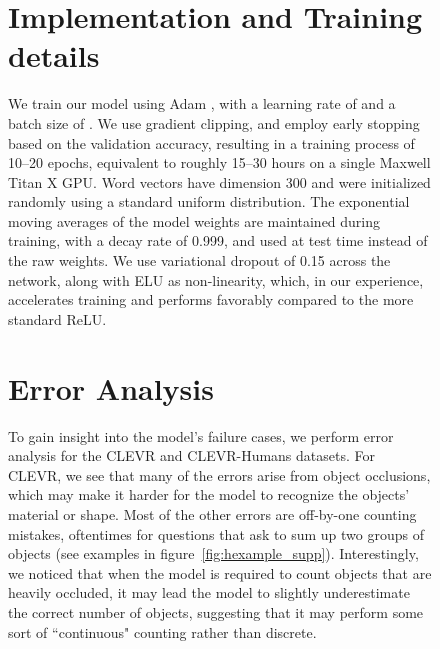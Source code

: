 \documentclass[fleqn]{article}
\newcommand{\figref}[1]{figure~\ref{fig:#1}}
\begin{document}
\begin{figure}[t]
\begin{minipage}{0.55\textwidth}
\section{Implementation and Training details}
\label{sec:expDetails} 
We train our model using Adam \citep{adam}, with a learning rate of  and a batch size of . We use gradient clipping, and employ early stopping based on the validation accuracy, resulting in a training process of 10--20 epochs, equivalent to roughly 15--30 hours on a single Maxwell Titan X GPU. Word vectors have dimension 300 and were initialized randomly using a standard uniform distribution. The exponential moving averages of the model weights are maintained during training, with a decay rate of 0.999, and used at test time instead of the raw weights. We use variational dropout of 0.15 across the network, along with ELU as non-linearity, which, in our experience, accelerates training and performs favorably compared to the more standard ReLU. 

\section{Error Analysis}
\label{sec:erroranalysis} 
To gain insight into the model's failure cases, we perform error analysis for the CLEVR and CLEVR-Humans datasets. For CLEVR, we see that many of the errors arise from object occlusions, which may make it harder for the model to recognize the objects' material or shape. Most of the other errors are off-by-one counting mistakes, oftentimes for questions that ask to sum up two groups of objects (see examples in \figref{hexample_supp}). Interestingly, we noticed that when the model is required to count objects that are heavily occluded, it may lead the model to slightly underestimate the correct number of objects, suggesting that it may perform some sort of ``continuous" counting rather than discrete. 


\end{minipage}
\end{figure}
\end{document}
